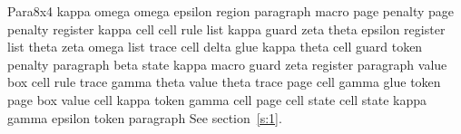 \documentclass{article}
\begin{document}
Para8x4 kappa omega omega epsilon region paragraph macro page penalty page penalty register kappa cell cell rule list kappa guard zeta theta epsilon register list theta zeta omega list trace cell delta glue kappa theta cell guard token penalty paragraph beta state kappa macro guard zeta register paragraph value box cell rule trace gamma theta value theta trace page cell gamma glue token page box value cell kappa token gamma cell page cell state cell state kappa gamma epsilon token paragraph See section~\ref{s:1}.
\end{document}
